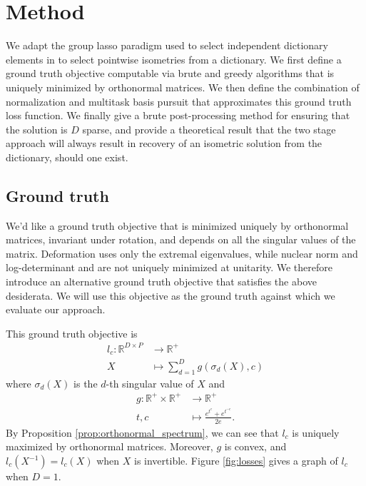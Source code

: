 \section{Method}

We adapt the group lasso paradigm used to select independent dictionary elements in \citet{Koelle2022-ju, Koelle2024-no} to select pointwise isometries from a dictionary.
We first define a ground truth objective computable via brute and greedy algorithms that is uniquely minimized by orthonormal matrices.
We then define the combination of normalization and multitask basis pursuit that approximates this ground truth loss function.
We finally give a brute post-processing method for ensuring that the solution is $D$ sparse, and provide a theoretical result that the two stage approach will always result in recovery of an isometric solution from the dictionary, should one exist.

\subsection{Ground truth}
\label{sec:ground_truth}

We'd like a ground truth objective that is minimized uniquely by orthonormal matrices, invariant under rotation, and depends on all the singular values of the matrix.
Deformation \citep{Kohli2021-lr} uses only the extremal eigenvalues, while nuclear norm and log-determinant \citep{Boyd2004-ql} and are not uniquely minimized at unitarity.
We therefore introduce an alternative ground truth objective that satisfies the above desiderata.
We will use this objective as the ground truth against which we evaluate our approach.

This ground truth objective is
\begin{align}
l_{c}: \mathbb R^{D \times P} &\to \mathbb R^{+} \\
X &\mapsto \sum_{d = 1}^D g(\sigma_d( X), c)
\end{align}
where $\sigma_d ( X)$ is the $d$-th singular value of $ X$ and
\begin{align}
g: \mathbb R^+ \times \mathbb R^+ &\to \mathbb R^+ \\
t,c &\mapsto \frac{e^{t^c} + e^{t^{-c}}}{2e}.
\end{align}
By Proposition \ref{prop:orthonormal_spectrum}, we can see that $l_c$ is uniquely maximized by orthonormal matrices.
Moreover, $g$ is convex, and $l_c( X^{-1}) = l_c( X)$ when $X$ is invertible.
Figure \ref{fig:losses} gives a graph of $l_c$ when $D=1$.

